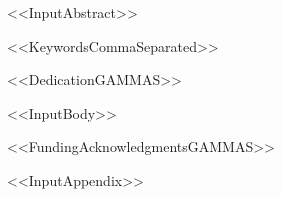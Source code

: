 \documentclass[%
usebiber,
<<DocumentClassOptions>>]{gammas}
\begin{document}
\maketitle

\begin{gammabstract}
<<InputAbstract>>
\end{gammabstract}

\begin{gammkeywords}
<<KeywordsCommaSeparated>>
\end{gammkeywords}

\newenvironment{gammdedication}{\indent\textbf{Dedication:}\begin{itshape}}{\end{itshape}\par}
<<DedicationGAMMAS>>

<<InputBody>>

<<FundingAcknowledgmentsGAMMAS>>

\appendix
<<InputAppendix>>

\end{document}
